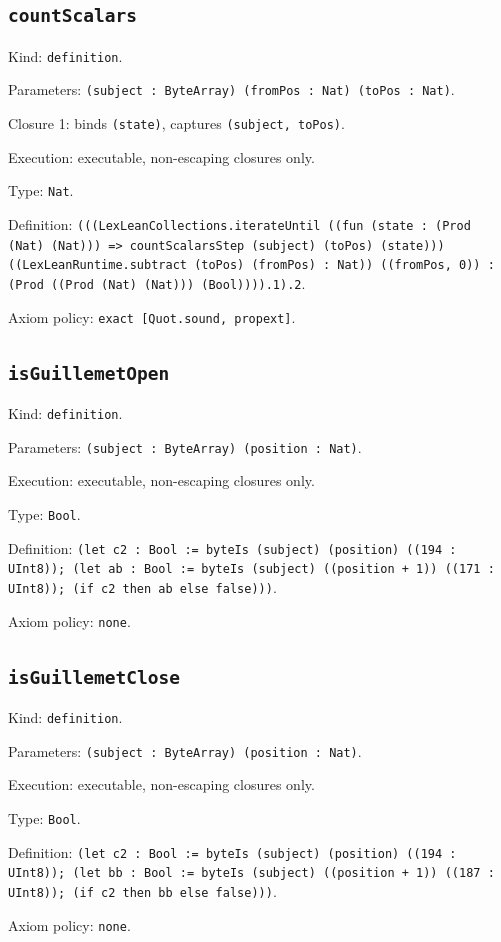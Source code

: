 \documentclass[11pt]{article}
\begin{document}
\subsection*{\texttt{countScalars}}
\noindent Kind: \texttt{definition}.\par
\noindent Parameters: \texttt{(subject : ByteArray) (fromPos : Nat) (toPos : Nat)}.\par
\noindent Closure 1: binds \texttt{(state)}, captures \texttt{(subject, toPos)}.\par
\noindent Execution: executable, non-escaping closures only.\par
\noindent Type: \texttt{Nat}.\par
\noindent Definition: \texttt{(((LexLeanCollections.iterateUntil ((fun (state : (Prod (Nat) (Nat))) => countScalarsStep (subject) (toPos) (state))) ((LexLeanRuntime.subtract (toPos) (fromPos) : Nat)) ((fromPos, 0)) : (Prod ((Prod (Nat) (Nat))) (Bool)))).1).2}.\par
\noindent Axiom policy: \texttt{exact [Quot.sound, propext]}.\par
\subsection*{\texttt{isGuillemetOpen}}
\noindent Kind: \texttt{definition}.\par
\noindent Parameters: \texttt{(subject : ByteArray) (position : Nat)}.\par
\noindent Execution: executable, non-escaping closures only.\par
\noindent Type: \texttt{Bool}.\par
\noindent Definition: \texttt{(let c2 : Bool := byteIs (subject) (position) ((194 : UInt8)); (let ab : Bool := byteIs (subject) ((position + 1)) ((171 : UInt8)); (if c2 then ab else false)))}.\par
\noindent Axiom policy: \texttt{none}.\par
\subsection*{\texttt{isGuillemetClose}}
\noindent Kind: \texttt{definition}.\par
\noindent Parameters: \texttt{(subject : ByteArray) (position : Nat)}.\par
\noindent Execution: executable, non-escaping closures only.\par
\noindent Type: \texttt{Bool}.\par
\noindent Definition: \texttt{(let c2 : Bool := byteIs (subject) (position) ((194 : UInt8)); (let bb : Bool := byteIs (subject) ((position + 1)) ((187 : UInt8)); (if c2 then bb else false)))}.\par
\noindent Axiom policy: \texttt{none}.\par
\end{document}
